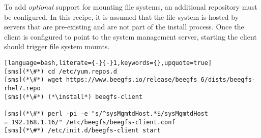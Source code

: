 To add {\em optional} support for mounting \beegfs{} file systems, an 
additional \pkgmgr{} repository must be configured. In this recipe, it is
assumed that the \beegfs{} file system is hosted by servers that are pre-existing
and are not part of the install process. Once the client is configured to point 
to the \beegfs{} system management server, starting the client should trigger file 
system mounts.

\begin{lstlisting}[language=bash,literate={-}{-}1,keywords={},upquote=true]
[sms](*\#*) cd /etc/yum.repos.d
[sms](*\#*) wget https://www.beegfs.io/release/beegfs_6/dists/beegfs-rhel7.repo
[sms](*\#*) (*\install*) beegfs-client

[sms](*\#*) perl -pi -e "s/^sysMgmtdHost.*$/sysMgmtdHost                  = 192.168.1.16/" /etc/beegfs/beegfs-client.conf
[sms](*\#*) /etc/init.d/beegfs-client start
\end{lstlisting}
